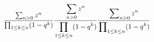 \documentclass{article}
\begin{document}
\[
  \frac{\sum_{n > 0} z^n}
  {\prod_{1\leq k\leq n} (1-q^k)}
  \\
  \frac{{\displaystyle\sum_{n > 0} z^n}}
  {{\displaystyle\prod_{1\leq k\leq n} (1-q^k)}}
  \\
  \frac{{\displaystyle\sum\nolimits_{n> 0} z^n}}
  {{\displaystyle\prod\nolimits_{1\leq k\leq n} (1-q^k)}}
\]
\end{document}
